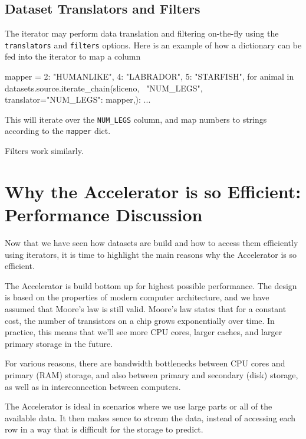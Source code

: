 \documentclass[a4paper]{article}
\begin{document}
\subsection{Dataset Translators and Filters}

The iterator may perform data translation and filtering on-the-fly
using the \texttt{translators} and \texttt{filters} options.  Here is
an example of how a dictionary can be fed into the iterator to map a
column
\begin{python}
  mapper = {2: "HUMANLIKE", 4: "LABRADOR", 5: "STARFISH",}
  for animal in datasets.source.iterate_chain(sliceno, \
     "NUM_LEGS", translator={"NUM_LEGS": mapper,}):
  ...
\end{python}
This will iterate over the \texttt{NUM\_LEGS} column, and map numbers
to strings according to the \texttt{mapper} dict.

Filters work similarly.



\clearpage

\section{Why the Accelerator is so Efficient:  Performance Discussion}
Now that we have seen how datasets are build and how to access them
efficiently using iterators, it is time to highlight the main reasons
why the Accelerator is so efficient.

The Accelerator is build bottom up for highest possible performance.
The design is based on the properties of modern computer architecture,
and we have assumed that Moore's law is still valid.  Moore's law
states that for a constant cost, the number of transistors on a chip
grows exponentially over time.  In practice, this means that we'll see
more CPU cores, larger caches, and larger primary storage in the
future.

For various reasons, there are bandwidth bottlenecks between CPU cores
and primary (RAM) storage, and also between primary and secondary
(disk) storage, as well as in interconnection between computers.

The Accelerator is ideal in scenarios where we use large parts or all
of the available data.  It then makes sence to stream the data,
instead of accessing each row in a way that is difficult for the
storage to predict.
\end{document}

